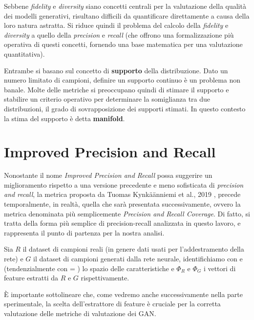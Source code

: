 Sebbene \textit{fidelity} e \textit{diversity} siano concetti centrali per la valutazione della qualità dei modelli generativi, risultano difficili da quantificare direttamente a causa della loro natura astratta.
Si riduce quindi il problema del calcolo della \textit{fidelity} e \textit{diversity} a quello della \textit{precision} e \textit{recall} (che offrono una formalizzazione più operativa di questi concetti, fornendo una base matematica per una valutazione quantitativa).\

Entrambe si basano sul concetto di \textbf{supporto} della distribuzione. Dato un numero limitato di campioni, definire un supporto continuo è un problema non banale. 
Molte delle metriche si preoccupano quindi di stimare il supporto e stabilire un criterio operativo per determinare la somiglianza tra due distribuzioni, il grado di sovrapposizione dei supporti stimati.
In questo contesto la stima del supporto è detta \textbf{manifold}.

\section{Improved Precision and Recall}
\label{sec:improved-precision-and-recall}

Nonostante il nome \textit{Improved Precision and Recall} possa suggerire un miglioramento rispetto a una versione precedente e meno sofisticata di \textit{precision and recall}, 
la metrica proposta da Tuomas Kynkäänniemi et al., 2019 \cite{2ImprovedPrecisionRecall}, precede temporalmente, in realtà, quella che sarà presentata successivamente, ovvero la metrica denominata più semplicemente \textit{Precision and Recall Coverage}. 
Di fatto, si tratta della forma più semplice di precision-recall analizzata in questo lavoro, e rappresenta il punto di partenza per la nostra analisi.

Sia \(R\) il dataset di campioni reali (in genere dati usati per l'addestramento della rete) e \(G\) il dataset di campioni generati dalla rete neurale, identifichiamo con  e  (tendenzialmente con  = ) lo spazio delle caratteristiche e \(\Phi_R\) e \(\Phi_G\) i vettori di feature estratti da \(R\) e \(G\) rispettivamente.

È importante sottolineare che, come vedremo anche successivamente nella parte sperimentale, la scelta dell'estrattore di feature è cruciale per la corretta valutazione delle metriche di valutazione dei GAN.

